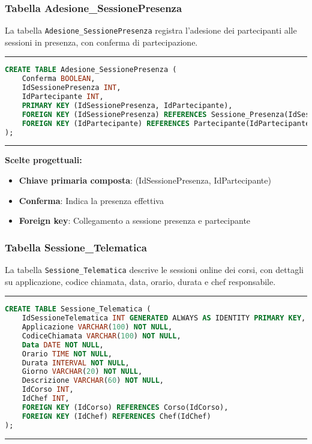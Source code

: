 \subsubsection{Tabella Adesione\_SessionePresenza}

La tabella \texttt{Adesione\_SessionePresenza} registra l'adesione dei partecipanti alle sessioni in presenza, con conferma di partecipazione.

\noindent\rule{\textwidth}{0.4pt}
\begin{lstlisting}[language=SQL, style=sqlstyle]
CREATE TABLE Adesione_SessionePresenza (
    Conferma BOOLEAN,
    IdSessionePresenza INT,
    IdPartecipante INT,
    PRIMARY KEY (IdSessionePresenza, IdPartecipante),
    FOREIGN KEY (IdSessionePresenza) REFERENCES Sessione_Presenza(IdSessionePresenza),
    FOREIGN KEY (IdPartecipante) REFERENCES Partecipante(IdPartecipante)
);
\end{lstlisting}
\noindent\rule{\textwidth}{0.4pt}

\textbf{Scelte progettuali:}
\begin{itemize}
    \item \textbf{Chiave primaria composta}: (IdSessionePresenza, IdPartecipante)
    \item \textbf{Conferma}: Indica la presenza effettiva
    \item \textbf{Foreign key}: Collegamento a sessione presenza e partecipante
\end{itemize}

\subsubsection{Tabella Sessione\_Telematica}

La tabella \texttt{Sessione\_Telematica} descrive le sessioni online dei corsi, con dettagli su applicazione, codice chiamata, data, orario, durata e chef responsabile.

\noindent\rule{\textwidth}{0.4pt}
\begin{lstlisting}[language=SQL, style=sqlstyle]
CREATE TABLE Sessione_Telematica (
    IdSessioneTelematica INT GENERATED ALWAYS AS IDENTITY PRIMARY KEY,
    Applicazione VARCHAR(100) NOT NULL,
    CodiceChiamata VARCHAR(100) NOT NULL,
    Data DATE NOT NULL,
    Orario TIME NOT NULL,
    Durata INTERVAL NOT NULL,
    Giorno VARCHAR(20) NOT NULL,
    Descrizione VARCHAR(60) NOT NULL,
    IdCorso INT,
    IdChef INT,
    FOREIGN KEY (IdCorso) REFERENCES Corso(IdCorso),
    FOREIGN KEY (IdChef) REFERENCES Chef(IdChef)
);
\end{lstlisting}
\noindent\rule{\textwidth}{0.4pt}

